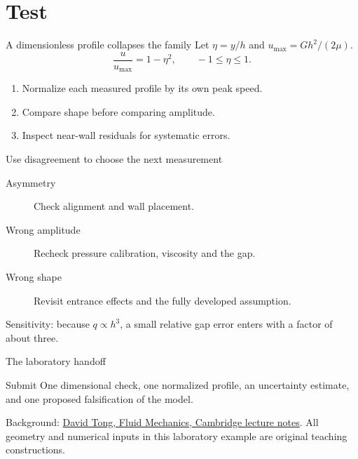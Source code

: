 \documentclass[11pt,aspectratio=169]{beamer}
\begin{document}
\section{Test}
\begin{frame}{A dimensionless profile collapses the family}
Let $\eta=y/h$ and $u_{\max}=Gh^2/(2\mu)$.
\[
 \frac{u}{u_{\max}}=1-\eta^2,\qquad -1\leq\eta\leq1.
\]
\begin{enumerate}
\item Normalize each measured profile by its own peak speed.
\item Compare shape before comparing amplitude.
\item Inspect near-wall residuals for systematic errors.
\end{enumerate}
\end{frame}
\begin{frame}{Use disagreement to choose the next measurement}
\begin{description}
\item[Asymmetry] Check alignment and wall placement.
\item[Wrong amplitude] Recheck pressure calibration, viscosity and the gap.
\item[Wrong shape] Revisit entrance effects and the fully developed assumption.
\end{description}
\pause
\alert{Sensitivity:} because $q\propto h^3$, a small relative gap error enters with a factor of about three.
\end{frame}
\begin{frame}{The laboratory handoff}
\begin{block}{Submit}
One dimensional check, one normalized profile, an uncertainty estimate, and one proposed falsification of the model.
\end{block}
\small
Background: \href{https://davidtong.org/teaching/fluid-mechanics/}{David Tong, Fluid Mechanics, Cambridge lecture notes}.
\medskip
All geometry and numerical inputs in this laboratory example are original teaching constructions.
\end{frame}
\end{document}
